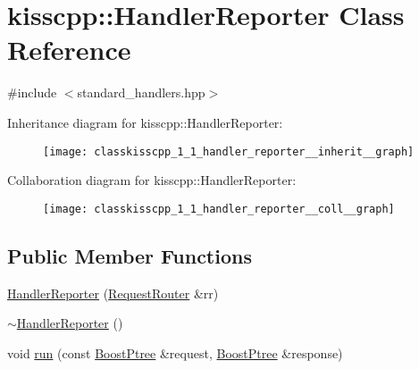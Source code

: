 \hypertarget{classkisscpp_1_1_handler_reporter}{\section{kisscpp\-:\-:Handler\-Reporter Class Reference}
\label{classkisscpp_1_1_handler_reporter}
}


{\ttfamily \#include $<$standard\-\_\-handlers.\-hpp$>$}



Inheritance diagram for kisscpp\-:\-:Handler\-Reporter\-:
\nopagebreak
\begin{figure}[H]
\begin{center}
\leavevmode
\texttt{[image: classkisscpp\_1\_1\_handler\_reporter\_\_inherit\_\_graph]}
\end{center}
\end{figure}


Collaboration diagram for kisscpp\-:\-:Handler\-Reporter\-:
\nopagebreak
\begin{figure}[H]
\begin{center}
\leavevmode
\texttt{[image: classkisscpp\_1\_1\_handler\_reporter\_\_coll\_\_graph]}
\end{center}
\end{figure}
\subsection*{Public Member Functions}
\begin{DoxyCompactItemize}
\item 
\hyperlink{classkisscpp_1_1_handler_reporter_a3453f6a6fa7a265c64d10703be4ba0bd}{Handler\-Reporter} (\hyperlink{classkisscpp_1_1_request_router}{Request\-Router} \&rr)
\item 
\hyperlink{classkisscpp_1_1_handler_reporter_a8fa462a342186238f7a3e956b936d9b4}{$\sim$\-Handler\-Reporter} ()
\item 
void \hyperlink{classkisscpp_1_1_handler_reporter_a5085be2e4dcfa1e98bf517c8d0b5443f}{run} (const \hyperlink{boost__ptree_8hpp_ab36820650b8e0db36402aea80485633c}{Boost\-Ptree} \&request, \hyperlink{boost__ptree_8hpp_ab36820650b8e0db36402aea80485633c}{Boost\-Ptree} \&response)
\end{DoxyCompactItemize}


